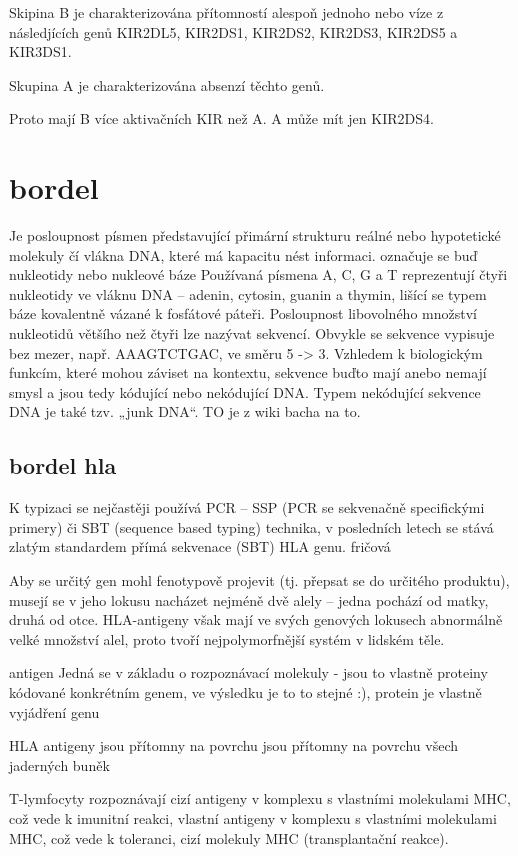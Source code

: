 \documentclass[czech,DP]{thesiskiv}
\begin{document}
Skipina B je charakterizována přítomností alespoň jednoho nebo víze z následjících genů KIR2DL5, KIR2DS1, KIR2DS2, KIR2DS3, KIR2DS5 a KIR3DS1.

Skupina A je charakterizována absenzí těchto genů. 

Proto mají B více aktivačních KIR než A. A může mít jen KIR2DS4.



\section{bordel}

Je posloupnost písmen představující přimární strukturu reálné nebo hypotetické molekuly čí vlákna DNA, které má kapacitu nést informaci.
označuje se buď nukleotidy nebo nukleové báze
Používaná písmena A, C, G a T reprezentují čtyři nukleotidy ve vláknu DNA – adenin, cytosin, guanin a thymin, lišící se 
typem báze kovalentně vázané k fosfátové páteři. Posloupnost libovolného množství nukleotidů většího než čtyři lze nazývat 
sekvencí. Obvykle se sekvence vypisuje bez mezer, např. AAAGTCTGAC, ve směru 5 -> 3. Vzhledem k biologickým funkcím, které 
mohou záviset na kontextu, sekvence buďto mají anebo nemají smysl a jsou tedy kódující nebo nekódující DNA. Typem nekódující 
sekvence DNA je také tzv. „junk DNA“. TO je z wiki bacha na to.
\subsection{bordel hla}
K typizaci se nejčastěji používá PCR – SSP (PCR se sekvenačně specifickými primery) či
SBT (sequence based typing) technika, v posledních letech se stává zlatým standardem přímá
sekvenace (SBT) HLA genu.
fričová


Aby se určitý gen mohl fenotypově projevit (tj. přepsat se do určitého produktu),
musejí se v jeho lokusu nacházet nejméně dvě alely – jedna pochází od matky, druhá od
otce. HLA-antigeny však mají ve svých genových lokusech abnormálně velké množství
alel, proto tvoří nejpolymorfnější systém v lidském těle.


antigen Jedná se v základu o rozpoznávací molekuly - jsou to vlastně proteiny kódované konkrétním genem, ve výsledku je to to stejné :), protein je vlastně vyjádření genu 

HLA antigeny jsou přítomny na povrchu jsou přítomny na povrchu všech jaderných buněk





 T-lymfocyty rozpoznávají
cizí antigeny v komplexu s vlastními molekulami MHC, což vede k imunitní reakci,
vlastní antigeny v komplexu s vlastními molekulami MHC, což vede k toleranci,
cizí molekuly MHC (transplantační reakce).
\end{document}
